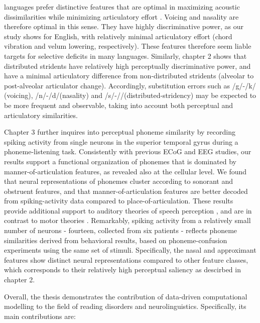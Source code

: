 languages prefer distinctive features that are optimal in maximizing acoustic dissimilarities while minimizing articulatory effort \citep{stevens1989quantal, stevens2002toward}. Voicing and nasality are therefore optimal in this sense. They have highly discriminative power, as our study shows for English, with relatively minimal articulatory effort (chord vibration and velum lowering, respectively). These features therefore seem liable targets for selective deficits in many languages. Similarly, chapter 2 shows that distributed stridents have relatively high perceptually discriminative power, and have a minimal articulatory difference from non-distributed stridents (alveolar to post-alveolar articulator change). Accordingly, substitution errors such as /g/-/k/ (voicing), /n/-/d/(nasality) and /s/-//(distributed-stridency) may be expected to be more frequent and observable, taking into account both perceptual and articulatory similarities.

Chapter 3 further inquires into perceptual phoneme similarity by recording spiking activity from single neurons in the superior temporal gyrus during a phoneme-listening task. Consistently with previous ECoG and EEG studies, our results support a functional organization of phonemes that is dominated by manner-of-articulation features, as revealed also at the cellular level. We found that neural representations of phonemes cluster according to sonorant and obstruent features, and that manner-of-articulation features are better decoded from spiking-activity data compared to place-of-articulation. These results provide additional support to auditory theories of speech perception \citep{stevens1989quantal, stevens2002toward}, and are in contrast to motor theories \citep{liberman1985motor, browman1992articulatory}. Remarkably, spiking activity from a relatively small number of neurons - fourteen, collected from six patients - reflects phoneme similarities derived from behavioral results, based on phoneme-confusion experiments using the same set of stimuli. Specifically, the nasal and approximant features show distinct neural representations compared to other feature classes, which corresponds to their relatively high perceptual saliency as descirbed in chapter 2. 

Overall, the thesis demonstrates the contribution of data-driven computational modelling to the field of reading disorders and neurolinguistics. Specifically, its main contributions are:



